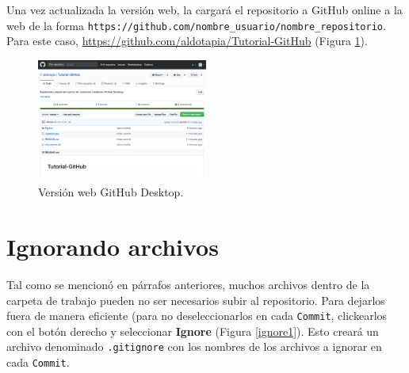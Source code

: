 \documentclass[10pt]{article}
\begin{document}
Una vez actualizada la versión web, la cargará el repositorio a GitHub online a la web de la forma \verb+https://github.com/nombre_usuario/nombre_repositorio+. Para este caso, \url{https://github.com/aldotapia/Tutorial-GitHub} (Figura \ref{web2}).\\

\begin{figure}[!h]
  \centering
    \includegraphics[width=0.5\textwidth]{Figuras/web2.png}
  \caption{Versión web GitHub Desktop.}
  \label{web2}
\end{figure}

\FloatBarrier

\section{Ignorando archivos}

Tal como se mencionó en párrafos anteriores, muchos archivos dentro de la carpeta de trabajo pueden no ser necesarios subir al repositorio. Para dejarlos fuera de manera eficiente (para no deseleccionarlos en cada \texttt{Commit}, clickearlos con el botón derecho y seleccionar \textbf{Ignore} (Figura \ref{ignore1}). Esto creará un archivo denominado \texttt{.gitignore} con los nombres de los archivos a ignorar en cada \texttt{Commit}.\\
\end{document}
